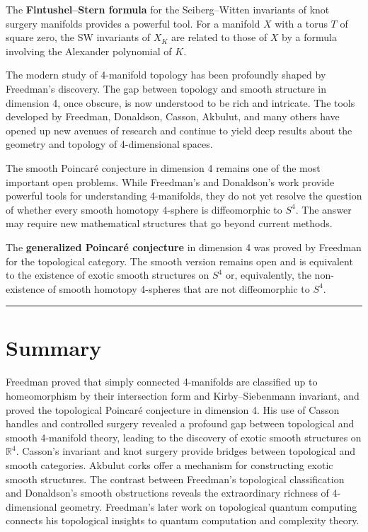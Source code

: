 The \textbf{Fintushel--Stern formula} for the Seiberg--Witten invariants of knot surgery manifolds provides a powerful tool. For a manifold $X$ with a torus $T$ of square zero, the SW invariants of $X_K$ are related to those of $X$ by a formula involving the Alexander polynomial of $K$.

The modern study of 4-manifold topology has been profoundly shaped by Freedman's discovery. The gap between topology and smooth structure in dimension 4, once obscure, is now understood to be rich and intricate. The tools developed by Freedman, Donaldson, Casson, Akbulut, and many others have opened up new avenues of research and continue to yield deep results about the geometry and topology of 4-dimensional spaces.

The smooth Poincar\'e conjecture in dimension 4 remains one of the most important open problems. While Freedman's and Donaldson's work provide powerful tools for understanding 4-manifolds, they do not yet resolve the question of whether every smooth homotopy 4-sphere is diffeomorphic to $S^4$. The answer may require new mathematical structures that go beyond current methods.

The \textbf{generalized Poincaré conjecture} in dimension 4 was proved by Freedman for the topological category. The smooth version remains open and is equivalent to the existence of exotic smooth structures on $S^4$ or, equivalently, the non-existence of smooth homotopy 4-spheres that are not diffeomorphic to $S^4$.

\begin{center}\rule{0.5\linewidth}{0.5pt}\end{center}

\section*{Summary}

Freedman proved that simply connected 4-manifolds are classified up to homeomorphism by their intersection form and Kirby--Siebenmann invariant, and proved the topological Poincar\'e conjecture in dimension 4. His use of Casson handles and controlled surgery revealed a profound gap between topological and smooth 4-manifold theory, leading to the discovery of exotic smooth structures on $\mathbb{R}^4$. Casson's invariant and knot surgery provide bridges between topological and smooth categories. Akbulut corks offer a mechanism for constructing exotic smooth structures. The contrast between Freedman's topological classification and Donaldson's smooth obstructions reveals the extraordinary richness of 4-dimensional geometry. Freedman's later work on topological quantum computing connects his topological insights to quantum computation and complexity theory.

